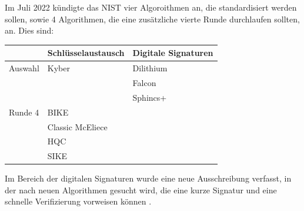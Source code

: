 		Im Juli 2022 kündigte das \ac{NIST} vier Algoroithmen an, die standardisiert werden sollen, sowie 4 Algorithmen, die eine zusätzliche vierte Runde durchlaufen sollten, an. Dies sind:
		\begin{center}
			\begin{tabular}{|l|l|l|}
				\hline	
				& Schlüsselaustausch & Digitale Signaturen \\
				\hline
				Auswahl & Kyber & Dilithium \\
				& & Falcon \\
				& & Sphincs+ \\
				\hline
				Runde 4 & BIKE &  \\
				& Classic McEliece &  \\
				& HQC &  \\
				& SIKE & \\
				\hline
			\end{tabular}
		\end{center}
		
		Im Bereich der digitalen Signaturen wurde eine neue Ausschreibung verfasst, in der nach neuen Algorithmen gesucht wird, die eine kurze Signatur und eine schnelle Verifizierung vorweisen können \cite{NIST2022}.
		